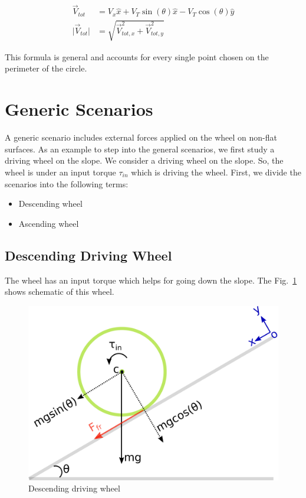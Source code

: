 \documentclass[letterpaper, 10pt, conference]{ieeeconf}
\begin{document}
\begin{align}
\vec{V}_{tot} &= V_x \hat{x} + V_T \sin(\theta)\hat{x} - V_T \cos(\theta)\hat{y} \\
\lvert \vec{V}_{tot} \rvert &= \sqrt{\vec{V}_{tot,x}^2 + \vec{V}_{tot,y}^2}
\end{align}

This formula is general and accounts for every single point chosen on the perimeter of the circle.
\section{Generic Scenarios}

A generic scenario includes external forces applied on the wheel on non-flat surfaces. As an example to step into the general scenarios, we first study a driving wheel on the slope.
We consider a driving wheel on the slope. So, the wheel is under an input torque $\tau_{in}$ which is driving the wheel. First, we divide the scenarios into the following terms:
\begin{itemize}
	\item Descending wheel
	\item Ascending wheel
\end{itemize}

\subsection{Descending Driving Wheel}
The wheel has an input torque which helps for going down the slope. The Fig.~\ref{slopeDown} shows schematic of this wheel.

\begin{figure}[!h] 
	\centering
	\includegraphics[width=0.85\columnwidth]{figs/slopeDown.pdf}
	\caption{Descending driving wheel}
	\label{slopeDown}
\end{figure}
\end{document}
